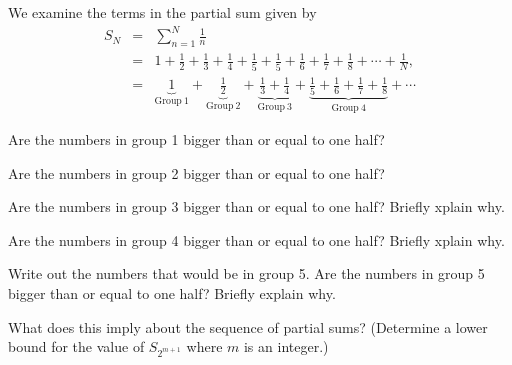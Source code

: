 \begin{problem}
  \item We examine the terms in the partial sum given by
  \begin{eqnarray*}
    S_N & = & \sum^N_{n=1} \frac{1}{n} \\
    & = & 1 + \frac{1}{2} + \frac{1}{3} + \frac{1}{4} + \frac{1}{5} + \frac{1}{5} + \frac{1}{6} + \frac{1}{7} + \frac{1}{8} + \cdots + \frac{1}{N}, \\
    & = & \underbrace{1}_{\mathrm{Group~1}} + \underbrace{\frac{1}{2}}_{\mathrm{Group~2}} + \underbrace{\frac{1}{3} + \frac{1}{4}}_{\mathrm{Group~3}}
     + \underbrace{\frac{1}{5} + \frac{1}{6} + \frac{1}{7} + \frac{1}{8}}_{\mathrm{Group~4}} + \cdots
  \end{eqnarray*}
  \begin{subproblem}
    \item Are the numbers in group 1 bigger than or equal to one half?
      \vfill
    \item Are the numbers in group 2 bigger than or equal to one half?
      \vfill
    \item Are the numbers in group 3 bigger than or equal to one half? Briefly xplain why.
    \vfill
    \vfill
    \item Are the numbers in group 4 bigger than or equal to one half? Briefly xplain why.
    \vfill
    \vfill
    \item Write out the numbers that would be in group 5. Are the numbers in group 5 bigger than or equal to one half? Briefly explain why.
    \vfill
    \vfill
    \item  What does this imply about the sequence of partial sums? (Determine a lower bound for the value of $S_{2^{m+1}}$ where $m$ is an integer.)
    \vfill
  \end{subproblem}

\end{problem}


